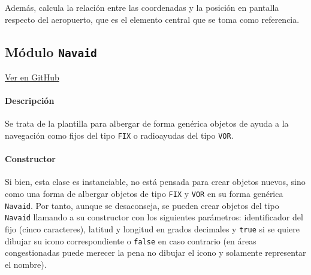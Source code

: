 Además, calcula la relación entre las coordenadas y la posición en pantalla respecto del aeropuerto, que es el elemento central que se toma como referencia.






\clearpage

\subsection{Módulo \texttt{Navaid}}
\label{subsec:ClaseNavaid}

\vspace{-0.85cm}
\begin{flushright}
\href{https://github.com/macgyver912/atc-simulator/blob/jaime/Assets/Scripts/navaids/Navaid.cs}{Ver en GitHub \faGithub}
\end{flushright}

\paragraph{Descripción} \phantom{\newline}

Se trata de la plantilla para albergar de forma genérica objetos de ayuda a la navegación como fijos del tipo \texttt{FIX} o radioayudas del tipo \texttt{VOR}.

\paragraph{Constructor} \phantom{\newline}

Si bien, esta clase es instanciable, no está pensada para crear objetos nuevos, sino como una forma de albergar objetos de tipo \texttt{FIX} y \texttt{VOR} en su forma genérica \texttt{Navaid}. Por tanto, aunque se desaconseja, se pueden crear objetos del tipo \texttt{Navaid} llamando a su constructor con los siguientes parámetros: identificador del fijo (cinco caracteres), latitud y longitud en grados decimales y \texttt{true} si se quiere dibujar su icono correspondiente o \texttt{false} en caso contrario (en áreas congestionadas puede merecer la pena no dibujar el icono y solamente representar el nombre). 

